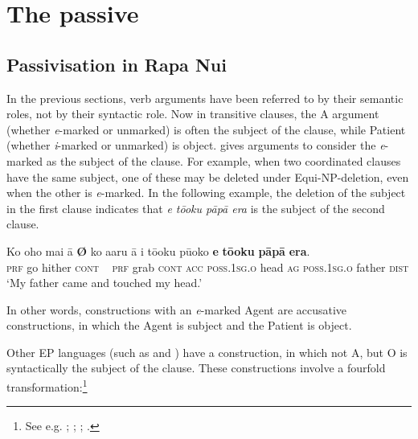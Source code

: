 \section{The passive}\label{sec:8.5}
\subsection{Passivisation in Rapa Nui}\label{sec:8.5.1}
In the previous sections, verb arguments have been referred to by their semantic roles, not by their syntactic role. Now in transitive clauses, the A argument (whether \textit{e}{}-marked or unmarked) is often the subject of the clause, while Patient (whether \textit{i}{}-marked or unmarked) is object. \citet[136–137]{Alexander1981OL} gives arguments to consider the \textit{e}-marked  as the subject of the clause. For example, when two coordinated clauses have the same subject, one of these may be deleted under Equi-NP{}-deletion, even when the other is \textit{e}{}-marked. In the following example, the deletion of the subject in the first clause indicates that \textit{e \mbox{tō{\ꞌ}oku} pāpā era} is the subject of the second clause.

\ea\label{ex:8.45}
\gll Ko oho mai {\ꞌ}ā \textbf{\textup{Ø}} ko {\ꞌ}a{\ꞌ}aru {\ꞌ}ā i tō{\ꞌ}oku pū{\ꞌ}oko \textbf{e} \textbf{tō{\ꞌ}oku} \textbf{pāpā} \textbf{era}.\\
\textsc{prf} go hither \textsc{cont} ~ \textsc{prf} grab \textsc{cont} \textsc{acc} \textsc{poss.1sg.o} head \textsc{ag} \textsc{poss.1sg.o} father \textsc{dist}\\

\glt
‘My father came and touched my head.’  
\z

In other words, constructions with an \textit{e}{}-marked Agent are accusative constructions, in which the Agent is subject and the Patient is object.

Other EP languages (such as  and ) have a  construction, in which not A, but O is syntactically the subject of the clause. These constructions involve a fourfold transformation:\footnote{\label{fn:412}See e.g. \citet[53]{WeberN2003}; \citet[67]{Clark1976}; \citet[171]{Harlow2007Maori}; \citet[90]{Harlow2007Subject}.}

